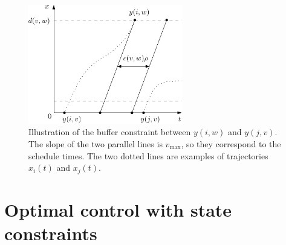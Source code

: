\documentclass[a4paper]{article}
\theoremstyle{definition}
\theoremstyle{plain}
\begin{document}
\begin{figure}[h]
  \centering
  \includegraphics[width=0.6\textwidth]{figures/capacity_constraint.pdf}
  \caption{Illustration of the buffer constraint between $y(i, w)$ and
    $y(j, v)$. The slope of the two parallel lines is $v_{\max}$, so they
    correspond to the schedule times. The two dotted lines are examples of
    trajectories $x_{i}(t)$ and $x_{j}(t)$.}
  \label{fig:buffer-constraint}
\end{figure}


\newpage

\section{Optimal control with state constraints}
\end{document}

